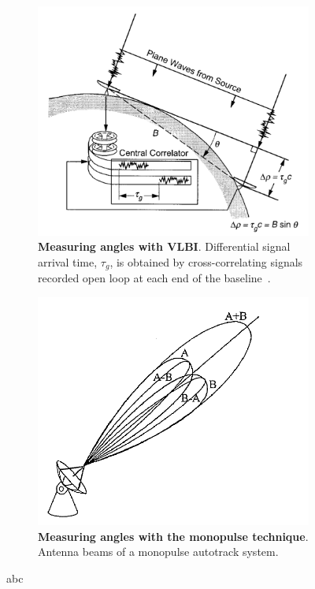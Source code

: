 \begin{figure}
    \centering
    \begin{subfigure}{.48\textwidth}
        \centering
        \includegraphics[width=.99\linewidth]{graphics/vlbi.PNG}
        \caption{
            \textbf{Measuring angles with VLBI}. Differential signal arrival time,
            $\tau_g$, is obtained by cross-correlating signals recorded open loop at
            each end of the baseline~\cite[p.~48]{Catherine2005}.
        }
        \label{fig:monopulse}
    \end{subfigure}\hspace{0.03\textwidth}
    \begin{subfigure}{.48\textwidth}
        \centering
        \includegraphics[width=.99\linewidth]{graphics/monopulse.PNG}
        \caption{
            \textbf{Measuring angles with the monopulse technique}. Antenna beams of a
            monopulse autotrack system.~\cite[p.~196]{Montenbruck2000}
        }
        \label{fig:vlbi}
    \end{subfigure}
    \caption{abc}
    \label{fig:test}
\end{figure}


